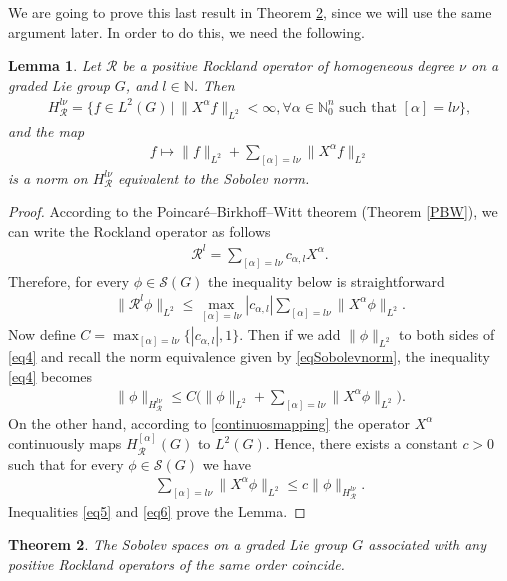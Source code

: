 \documentclass[12pt,oneside,a4paper]{book}
\numberwithin{equation}{section}     %
\theoremstyle{plain}
\newtheorem{theorem}{Theorem}[section]
\newtheorem{lemma}[theorem]{Lemma}
\theoremstyle{definition}
\newcommand{\N}{{\mathbb N}}
\begin{document}
We are going to prove this last result in Theorem \ref{THM:SobolevindepRockland}, since we will use the same argument later. In order to do this, we need the following.
\begin{lemma}\label{lemma1}
	Let $\mathcal{R}$ be a positive Rockland operator of homogeneous degree $\nu$ on a graded Lie group $G$, and $l\in\N$. Then
	\begin{align*}
	H_{\mathcal{R}}^{l\nu}=\Big\{f\in L^2(G)\,|\, \|X^\alpha f\|_{L^2}<\infty, \forall\alpha\in\N_0^n \text{ such that }[\alpha]=l\nu\Big\},
	\end{align*} 
	and the map
	\begin{align*}
	f\mapsto \|f\|_{L^2}+\sum_{[\alpha]=l\nu}\|X^\alpha f\|_{L^2}
	\end{align*}
	is a norm on $H^{l\nu}_{\mathcal{R}}$ equivalent to the Sobolev norm.
\end{lemma}
\begin{proof}
	According to the Poincar\'e--Birkhoff--Witt theorem (Theorem \ref{PBW}), we can write the Rockland operator as follows
	\begin{align*}
	\mathcal{R}^l=\sum_{[\alpha]=l\nu}c_{\alpha,l}X^\alpha.
	\end{align*} 
	Therefore, for every $\phi\in\mathcal{S}(G)$ the inequality below is straightforward
	\begin{align}\label{eq4}
	\|\mathcal{R}^l\phi\|_{L^2}\leq \max\limits_{[\alpha]=l\nu} |c_{\alpha,l}|\sum_{[\alpha]=l\nu}\|X^\alpha\phi\|_{L^2}.
	\end{align}
	Now define $C=\max_{[\alpha]=l\nu}\{|c_{\alpha,l}|,1\}$. Then if we add $\|\phi\|_{L^2}$ to both sides of \eqref{eq4} and recall the norm equivalence given by \eqref{eqSobolevnorm}, the inequality \eqref{eq4} becomes
	\begin{align}\label{eq5}
	\|\phi\|_{H^{l\nu}_\mathcal{R}}\leq C\Big(\|\phi\|_{L^2}+\sum_{[\alpha]=l\nu}\|X^\alpha \phi\|_{L^2}\Big).
	\end{align}
	On the other hand, according to  \eqref{continuosmapping} the operator $X^\alpha$ continuously maps $H^{[\alpha]}_\mathcal{R}(G)$ to $L^2(G)$. Hence, there exists a constant $c>0$ such that for every $\phi\in\mathcal S(G)$ we have
	\begin{align}\label{eq6}
	\sum_{[\alpha]=l\nu}\|X^\alpha\phi\|_{L^2}\leq c\|\phi\|_{H^{l\nu}_{\mathcal{R}}}.
	\end{align}
	Inequalities \eqref{eq5} and \eqref{eq6} prove the Lemma.
\end{proof}
\begin{theorem}
	\label{THM:SobolevindepRockland}
	The Sobolev spaces on a graded Lie group $G$ associated with \textit{any} positive Rockland operators of the same order coincide.
\end{theorem}
\end{document}
